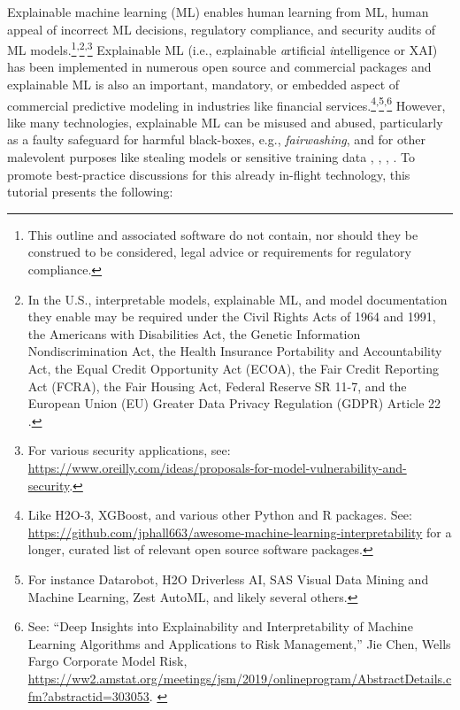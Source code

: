\documentclass[sigconf]{acmart}
\begin{document}
Explainable machine learning (ML) enables human learning from ML, human appeal of incorrect ML decisions, regulatory compliance, and security audits of ML models.\footnote{This outline and associated software do not contain, nor should they be construed to be considered, legal advice or requirements for regulatory compliance.}\textsuperscript{,}\footnote{In the U.S., interpretable models, explainable ML, and model documentation they enable may be required under the Civil Rights Acts of 1964 and 1991, the Americans with Disabilities Act, the Genetic Information Nondiscrimination Act, the Health Insurance Portability and Accountability Act, the Equal Credit Opportunity Act (ECOA), the Fair Credit Reporting Act (FCRA), the Fair Housing Act, Federal Reserve SR 11-7, and the European Union (EU) Greater Data Privacy Regulation (GDPR) Article 22 \cite{ff_interpretability}.\label{fn:regs}}\textsuperscript{,}\footnote{For various security applications, see: \url{https://www.oreilly.com/ideas/proposals-for-model-vulnerability-and-security}.} Explainable ML (i.e., e\textit{x}plainable \textit{a}rtificial \textit{i}ntelligence or XAI) has been implemented in numerous open source and commercial packages and explainable ML is also an important, mandatory, or embedded aspect of commercial predictive modeling in industries like financial services.\footnote{Like H2O-3, XGBoost, and various other Python and R packages. See: \url{https://github.com/jphall663/awesome-machine-learning-interpretability} for a longer, curated list of relevant open source software packages.}\textsuperscript{,}\footnote{For instance  Datarobot, H2O Driverless AI, SAS Visual Data Mining and Machine Learning, Zest AutoML, and likely several others.}\textsuperscript{,}\footnote{See: ``Deep Insights into Explainability and Interpretability of Machine Learning Algorithms and Applications to Risk Management,'' Jie Chen, Wells Fargo Corporate Model Risk, \url{https://ww2.amstat.org/meetings/jsm/2019/onlineprogram/AbstractDetails.cfm?abstractid=303053}. \label{fn:Chen}} However, like many technologies, explainable ML can be misused and abused, particularly as a faulty safeguard for harmful black-boxes, e.g., \textit{fairwashing}, and for other malevolent purposes like stealing models or sensitive training data \cite{fair_washing}, \cite{please_stop}, \cite{membership_inference}, \cite{model_stealing}. To promote best-practice discussions for this already in-flight technology, this tutorial presents the following:\\
\end{document}
